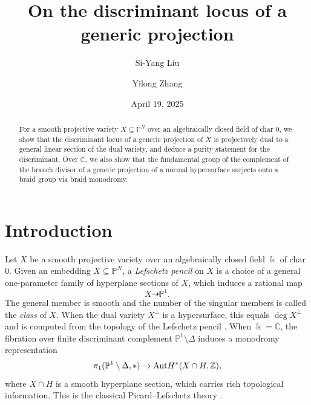 \documentclass[12pt]{amsart}
\title{On the discriminant locus of a generic projection}
\date{April 19, 2025}
\author{Si-Yang Liu}
\author{Yilong Zhang}
\newcommand{\C}{\mathbb{C}} %
\newcommand{\Z}{\mathbb{Z}}
\begin{document}
\maketitle


\begin{abstract}
For a smooth projective variety $X\subseteq \mathbb P^N$ over an algebraically closed field of char $0$, we show that the discriminant locus of a generic projection of $X$ is projectively dual to a general linear section of the dual variety, and deduce a purity statement for the discriminant. Over $\C$, we also show that the fundamental group of the complement of the branch divisor of a generic projection of a normal hypersurface surjects onto a braid group via braid monodromy.

\end{abstract}

\setcounter{tocdepth}{1} 
\tableofcontents

\section{Introduction}
Let $X$ be a smooth projective variety over an algebraically closed field $\Bbbk$ of char $0$. Given an embedding $X\subseteq \mathbb P^N$, a \textit{Lefschetz pencil} on $X$ is a choice of a general one-parameter family of hyperplane sections of $X$, which induces a rational map 
$$X\dashrightarrow \mathbb P^1.$$
The general member is smooth and the number of the singular members is called the \textit{class} of $X$. When the dual variety $X^{\perp}$ is a hypersurface, this equals $\deg X^{\perp}$ and is computed from the topology of the Lefschetz pencil \cite{Katz73,Lam81}. When $\Bbbk=\C$, the fibration over finite discriminant complement $\mathbb P^1\setminus  \Delta$ induces a monodromy representation
$$\pi_1(\mathbb P^1\setminus \Delta,*)\to \textup{Aut}H^*(X\cap H,\Z),$$
where $X\cap H$ is a smooth hyperplane section, which carries rich topological information. This is the classical Picard--Lefschetz theory \cite{Voisin}.
\end{document}
